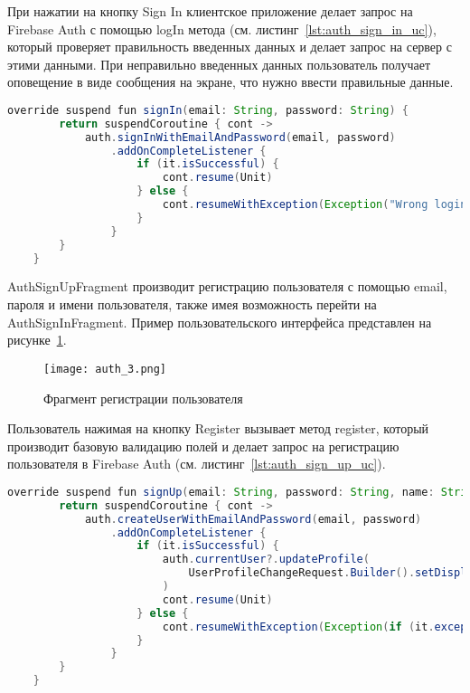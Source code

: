 При нажатии на кнопку Sign In клиентское приложение делает запрос на Firebase Auth с помощью logIn метода (см. листинг~\ref{lst:auth_sign_in_uc}), который проверяет правильность введенных данных и делает запрос на сервер с этими данными. При неправильно введенных данных пользователь получает оповещение в виде сообщения на экране, что нужно ввести правильные данные.

\begin{lstlisting}[language=Java,label={lst:auth_sign_in_uc},caption={SignIn}]
    override suspend fun signIn(email: String, password: String) {
        return suspendCoroutine { cont ->
            auth.signInWithEmailAndPassword(email, password)
                .addOnCompleteListener {
                    if (it.isSuccessful) {
                        cont.resume(Unit)
                    } else {
                        cont.resumeWithException(Exception("Wrong login or password"))
                    }
                }
        }
    }
\end{lstlisting}

AuthSignUpFragment производит регистрацию пользователя с помощью email, пароля и имени пользователя, также имея возможность перейти на AuthSignInFragment. Пример пользовательского интерфейса представлен на рисунке~\ref{fig:arch:auth_3}.

\begin{figure}[H]
 \centering
   \texttt{[image: auth\_3.png]} 
   \caption{Фрагмент регистрации пользователя}
   \label{fig:arch:auth_3}
\end{figure}

Пользователь нажимая на кнопку Register вызывает метод register, который производит базовую валидацию полей и делает запрос на регистрацию пользователя в Firebase Auth (см. листинг~\ref{lst:auth_sign_up_uc}).
\begin{lstlisting}[language=Java,label={lst:auth_sign_up_uc},caption={SignUp}]
    override suspend fun signUp(email: String, password: String, name: String) {
        return suspendCoroutine { cont ->
            auth.createUserWithEmailAndPassword(email, password)
                .addOnCompleteListener {
                    if (it.isSuccessful) {
                        auth.currentUser?.updateProfile(
                            UserProfileChangeRequest.Builder().setDisplayName(name).build()
                        )
                        cont.resume(Unit)
                    } else {
                        cont.resumeWithException(Exception(if (it.exception != null) it.exception!!.message else "Wrong login or password"))
                    }
                }
        }
    }
\end{lstlisting}

